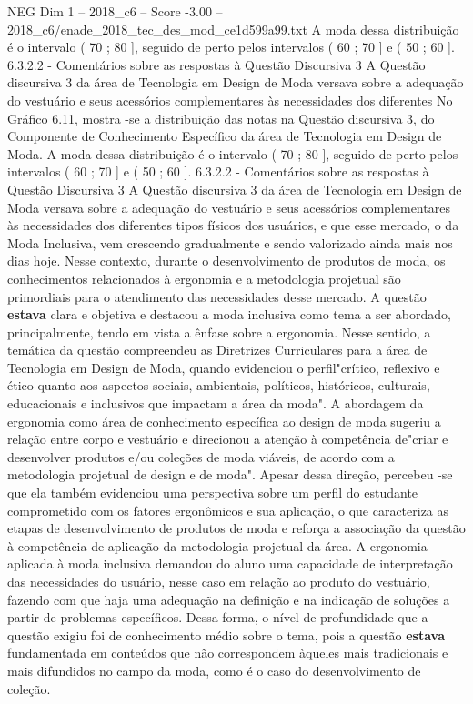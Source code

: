 \begin{textsample}{NEG Dim 1 – 2018\_c6 – Score -3.00 – 2018\_c6/enade\_2018\_tec\_des\_mod\_ce1d599a99.txt}
A moda dessa distribuição é o intervalo ( 70 ; 80 ], seguido de perto pelos intervalos ( 60 ; 70 ] e ( 50 ; 60 ]. 6.3.2.2 - Comentários sobre as respostas à Questão Discursiva 3 A Questão discursiva 3 da área de Tecnologia em Design de Moda versava sobre a adequação do vestuário e seus acessórios complementares às necessidades dos diferentes No Gráfico 6.11, mostra -se a distribuição das notas na Questão discursiva 3, do Componente de Conhecimento Específico da área de Tecnologia em Design de Moda.
A moda dessa distribuição é o intervalo ( 70 ; 80 ], seguido de perto pelos intervalos ( 60 ; 70 ] e ( 50 ; 60 ]. 6.3.2.2 - Comentários sobre as respostas à Questão Discursiva 3 A Questão discursiva 3 da área de Tecnologia em Design de Moda versava sobre a adequação do vestuário e seus acessórios complementares às necessidades dos diferentes tipos físicos dos usuários, e que esse mercado, o da Moda Inclusiva, vem crescendo gradualmente e sendo valorizado ainda mais nos dias hoje.
Nesse contexto, durante o desenvolvimento de produtos de moda, os conhecimentos relacionados à ergonomia e a metodologia projetual são primordiais para o atendimento das necessidades desse mercado.
A questão \textbf{estava} clara e objetiva e destacou a moda inclusiva como tema a ser abordado, principalmente, tendo em vista a ênfase sobre a ergonomia.
Nesse sentido, a temática da questão compreendeu as Diretrizes Curriculares para a área de Tecnologia em Design de Moda, quando evidenciou o perfil"crítico, reflexivo e ético quanto aos aspectos sociais, ambientais, políticos, históricos, culturais, educacionais e inclusivos que impactam a área da moda".
A abordagem da ergonomia como área de conhecimento específica ao design de moda sugeriu a relação entre corpo e vestuário e direcionou a atenção à competência de"criar e desenvolver produtos e/ou coleções de moda viáveis, de acordo com a metodologia projetual de design e de moda".
Apesar dessa direção, percebeu -se que ela também evidenciou uma perspectiva sobre um perfil do estudante comprometido com os fatores ergonômicos e sua aplicação, o que caracteriza as etapas de desenvolvimento de produtos de moda e reforça a associação da questão à competência de aplicação da metodologia projetual da área.
A ergonomia aplicada à moda inclusiva demandou do aluno uma capacidade de interpretação das necessidades do usuário, nesse caso em relação ao produto do vestuário, fazendo com que haja uma adequação na definição e na indicação de soluções a partir de problemas específicos.
Dessa forma, o nível de profundidade que a questão exigiu foi de conhecimento médio sobre o tema, pois a questão \textbf{estava} fundamentada em conteúdos que não correspondem àqueles mais tradicionais e mais difundidos no campo da moda, como é o caso do desenvolvimento de coleção.

\end{textsample}
